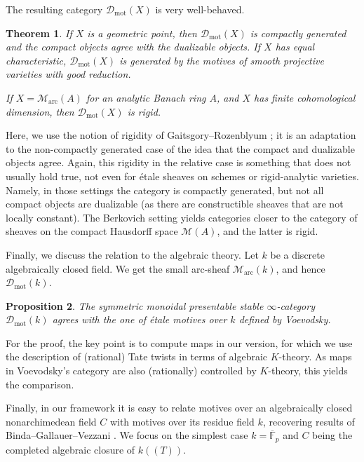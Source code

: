 \documentclass[11pt]{amsart}
\numberwithin{equation}{section}
\newtheorem{theorem}{Theorem}
\numberwithin{theorem}{section}
\newtheorem{proposition}[theorem]{Proposition}
\theoremstyle{definition}
\begin{document}
The resulting category $\mathcal D_{\mathrm{mot}}(X)$ is very well-behaved.

\begin{theorem} If $X$ is a geometric point, then $\mathcal D_{\mathrm{mot}}(X)$ is compactly generated and the compact objects agree with the dualizable objects. If $X$ has equal characteristic, $\mathcal D_{\mathrm{mot}}(X)$ is generated by the motives of smooth projective varieties with good reduction.

If $X=\mathcal M_{\mathrm{arc}}(A)$ for an analytic Banach ring $A$, and $X$ has finite cohomological dimension, then $\mathcal D_{\mathrm{mot}}(X)$ is rigid.
\end{theorem}

Here, we use the notion of rigidity of Gaitsgory--Rozenblyum \cite[Chapter I, Definition 9.1.2]{GaitsgoryRozenblyum}; it is an adaptation to the non-compactly generated case of the idea that the compact and dualizable objects agree. Again, this rigidity in the relative case is something that does not usually hold true, not even for \'etale sheaves on schemes or rigid-analytic varieties. Namely, in those settings the category is compactly generated, but not all compact objects are dualizable (as there are constructible sheaves that are not locally constant). The Berkovich setting yields categories closer to the category of sheaves on the compact Hausdorff space $\mathcal M(A)$, and the latter is rigid.

Finally, we discuss the relation to the algebraic theory. Let $k$ be a discrete algebraically closed field. We get the small arc-sheaf $\mathcal M_{\mathrm{arc}}(k)$, and hence $\mathcal D_{\mathrm{mot}}(k)$.

\begin{proposition} The symmetric monoidal presentable stable $\infty$-category $\mathcal D_{\mathrm{mot}}(k)$ agrees with the one of \'etale motives over $k$ defined by Voevodsky.
\end{proposition}

For the proof, the key point is to compute maps in our version, for which we use the description of (rational) Tate twists in terms of algebraic $K$-theory. As maps in Voevodsky's category are also (rationally) controlled by $K$-theory, this yields the comparison.

Finally, in our framework it is easy to relate motives over an algebraically closed nonarchimedean field $C$ with motives over its residue field $k$, recovering results of Binda--Gallauer--Vezzani \cite{BindaGallauerVezzani}. We focus on the simplest case $k=\overline{\mathbb F}_p$ and $C$ being the completed algebraic closure of $k((T))$.
\end{document}
